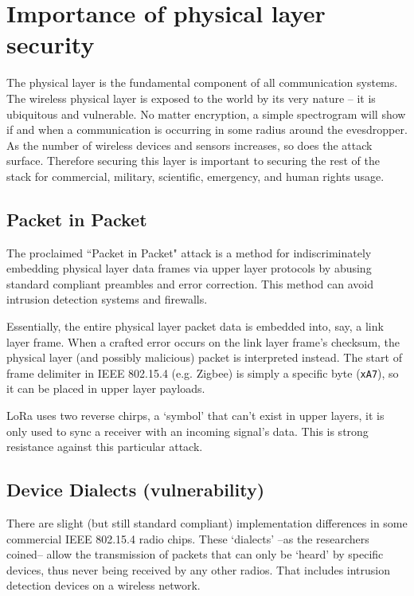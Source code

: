 \documentclass[conference, compsoc]{IEEEtran}
\begin{document}
\section{Importance of physical layer security}

The physical layer is the fundamental component of all communication systems. The wireless physical layer is exposed to the world by its very nature -- it is ubiquitous and vulnerable. No matter encryption, a simple spectrogram will show if and when a communication is occurring in some radius around the evesdropper. As the number of wireless devices and sensors increases, so does the attack surface. Therefore securing this layer is important to securing the rest of the stack for commercial, military, scientific, emergency, and human rights usage. 

\subsection{Packet in Packet}

The proclaimed ``Packet in Packet" attack\cite{pkt-in-pkt} is a method for indiscriminately embedding physical layer data frames via upper layer protocols by abusing standard compliant preambles and error correction. This method can avoid intrusion detection systems and firewalls. 

Essentially, the entire physical layer packet data is embedded into, say, a link layer frame. When a crafted error occurs on the link layer frame's checksum, the physical layer (and possibly malicious) packet is interpreted instead. The start of frame delimiter in IEEE 802.15.4 (e.g. Zigbee) is simply a specific byte (\texttt{xA7}), so it can be placed in upper layer payloads.

LoRa uses two reverse chirps, a `symbol' that can't exist in upper layers, it is only used to sync a receiver with an incoming signal's data. This is strong resistance against this particular attack. 

\subsection{Device Dialects (vulnerability)}
There are slight (but still standard compliant) implementation differences in some commercial IEEE 802.15.4 radio chips. These `dialects' --as the researchers coined-- allow the transmission of packets that can only be `heard' by specific devices, thus never being received by any other radios. That includes intrusion detection devices on a wireless network.\cite{dialect}
\end{document}

